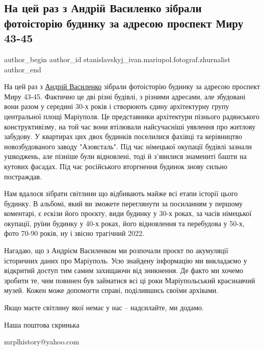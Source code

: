  
 
 
 
 

\subsection{На цей раз з Андрій Василенко зібрали фотоісторію будинку за адресою проспект Миру 43-45}
\label{sec:06_02_2023.fb.stanislavskyj_ivan.mariupol.fotograf.zhurnalist.1.na_tsei_raz_z_andr_i}

\ifcmt
 author_begin
   author_id stanislavskyj_ivan.mariupol.fotograf.zhurnalist
 author_end
\fi

На цей раз з
\href{https://www.facebook.com/profile.php?id=100005552716002}{Андрій
Василенко} зібрали фотоісторію будинку за адресою проспект Миру 43-45. Фактично
це дві різні будівлі, з різними адресами, але збудовані вони разом у середині
30-х років і створюють єдину архітектурну групу центральної площі Маріуполя. Це
представники архітектури пізнього радянського конструктивізму, на той час вони
втілювали найсучасніші уявлення про житлову забудову. У квартирах цих двох
будинків поселилися фахівці та керівництво новозбудованого заводу "Азовсталь".
Під час німецької окупації будівлі зазнали ушкоджень, але пізніше були
відновлені, тоді й з'явилися знамениті башти на кутових фасадах. Під час
російського вторгнення будинок знову сильно постраждав.

Нам вдалося зібрати світлини що відбивають майже всі етапи історії цього
будинку. В альбомі, який ви зможете переглянути за посиланням у першому
коментарі, є ескізи його проєкту, види будинку у 30-х роках, за часів німецької
окупації, руїни будинку у 40-х роках, його відновлення та перебудова у 50-х,
фото 70-90 років, ну і звісно трагічний 2022.

Нагадаю, що з Андрієм Василенком ми розпочали проєкт по акумуляції історичних
даних про Маріуполь. Усю знайдену інформацію ми викладаємо у відкритий доступ
тим самим захищаючи від зникнення. Де факто ми хочемо зробити те, чим повинен
був займатися всі ці роки Маріупольський краєзнавчий музей. Кожен може
допомогти справі, поділившись своїми архівами.

Якщо маєте світлину якої немає у нас – надсилайте, ми додамо.

Наша поштова скринька

mrplhistory@yahoo.com

